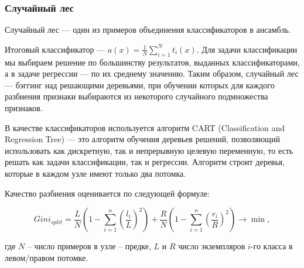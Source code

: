\subsubsection{Случайный лес}

Случайный лес — один из примеров объединения классификаторов в ансамбль.


\bigskip
Итоговый классификатор — $a(x) = \frac{1}{N} \sum_{i = 1}^{N} t_i(x)$. Для задачи классификации мы выбираем решение по большинству результатов, выданных классификаторами, а в задаче регрессии — по их среднему значению. Таким образом, случайный лес — бэггинг над решающими деревьями, при обучении которых для каждого разбиения признаки выбираются из некоторого случайного подмножества признаков.


\bigskip
В качестве классификаторов используется алгоритм CART (Classification and Regression Tree) --- это алгоритм обучения деревьев решений, позволяющий использовать как дискретную, так и непрерывную целевую переменную, то есть решать как задачи классификации, так и регрессии. Алгоритм строит деревья, которые в каждом узле имеют только два потомка.

\bigskip
Качество разбиения оценивается по следующей формуле:

\begin{equation*}
 Gini_{split}  = \frac{L}{N} \left( 1-\sum_{i=1}^n\left(\frac{l_i}{L}\right)^2 \right) + \frac{R}{N} \left(1- \sum_{i=1}^n\left(\frac{r_i}{R}\right)^2 \right) \to \min,
\end{equation*}


\bigskip
где $N$ -- число примеров в узле -- предке, $L$ и $R$ число экземпляров $i$-го класса в левом/правом потомке.

























